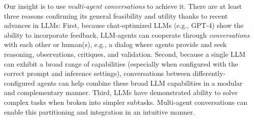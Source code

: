 
Our insight is to use \emph{multi-agent conversations} to achieve it. 
There are at least three reasons confirming its general feasibility and utility thanks to recent advances in LLMs: First, because chat-optimized LLMs (e.g., GPT-4) show the ability to incorporate feedback,  
LLM-agents can cooperate through {\em conversations} with each other or human(s), e.g., a dialog where agents provide and seek reasoning, observations, critiques, and validation. Second, because a single LLM can exhibit a broad range of capabilities (especially when configured with the correct prompt and inference settings), conversations between differently-configured agents can help 
combine
these broad LLM capabilities in a modular and complementary manner. 
{Third, LLMs have demonstrated ability to solve complex tasks when broken into simpler subtasks. Multi-agent conversations can enable this partitioning and integration in an intuitive manner.}





